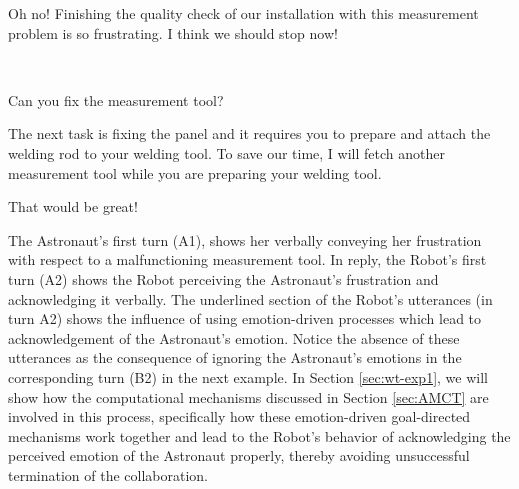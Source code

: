 \begin{description}
  \item \textit{\textbf{\fontsize{9pt}{12pt}\selectfont{A1. Astronaut:}}} Oh
  no! Finishing the quality check of our installation with this measurement
  problem is so frustrating. I think we should stop now!\\

  \item {}\\
  
  \item \textit{\textbf{\fontsize{9pt}{12pt}\selectfont{A3. Astronaut:}}} Can
  you fix the measurement tool?\\

  \item \textit{\textbf{\fontsize{9pt}{12pt}\selectfont{A4. Robot:}}} The next
  task is fixing the panel and it requires you to prepare and attach the welding
  rod to your welding tool. To save our time, I will fetch another measurement
  tool while you are preparing your welding tool.\\

  \item \textit{\textbf{\fontsize{9pt}{12pt}\selectfont{A5. Astronaut:}}} That
  would be great!
  
\end{description}

The Astronaut's first turn (A1), shows her verbally conveying her frustration
with respect to a malfunctioning measurement tool. In reply, the Robot's first
turn (A2) shows the Robot perceiving the Astronaut's frustration and
acknowledging it verbally. The underlined section of the Robot's utterances (in
turn A2) shows the influence of using emotion-driven processes which lead to
acknowledgement of the Astronaut's emotion. Notice the absence of these
utterances as the consequence of ignoring the Astronaut's emotions in the
corresponding turn (B2) in the next example. In Section \ref{sec:wt-exp1}, we
will show how the computational mechanisms discussed in Section \ref{sec:AMCT}
are involved in this process, specifically how these emotion-driven
goal-directed mechanisms work together and lead to the Robot's behavior of
acknowledging the perceived emotion of the Astronaut properly, thereby avoiding
unsuccessful termination of the collaboration.


